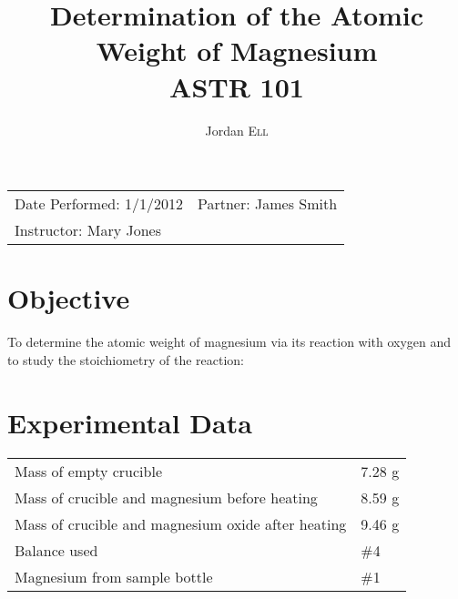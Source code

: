 \documentclass{article}
\title{Determination of the Atomic \\ Weight of Magnesium \\ ASTR 101} %
\author{Jordan \textsc{Ell}} %
\begin{document}
\maketitle %

\begin{tabular}{lr}
Date Performed: 1/1/2012 & Partner: James Smith\\ %
Instructor: Mary Jones %
\end{tabular}

\setlength\parindent{0pt} %

\renewcommand{\labelenumi}{\alph{enumi}.} %


\section{Objective}

To determine the atomic weight of magnesium via its reaction with oxygen and to study the stoichiometry of the reaction:\\


 

\section{Experimental Data}

\begin{tabular}{ll}
Mass of empty crucible & 7.28 g\\
Mass of crucible and magnesium before heating & 8.59 g\\
Mass of crucible and magnesium oxide after heating & 9.46 g\\
Balance used & \#4\\
Magnesium from sample bottle & \#1
\end{tabular}
\end{document}
